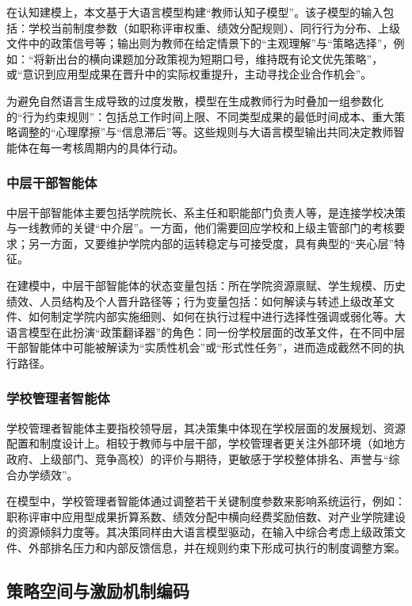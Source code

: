 \documentclass[UTF8, zihao=-4, fontset=mac]{ctexart}
\begin{document}
在认知建模上，本文基于大语言模型构建“教师认知子模型”。该子模型的输入包括：学校当前制度参数（如职称评审权重、绩效分配规则）、同行行为分布、上级文件中的政策信号等；输出则为教师在给定情景下的“主观理解”与“策略选择”，例如：“将新出台的横向课题加分政策视为短期口号，维持既有论文优先策略”，或“意识到应用型成果在晋升中的实际权重提升，主动寻找企业合作机会”。

为避免自然语言生成导致的过度发散，模型在生成教师行为时叠加一组参数化的“行为约束规则”：包括总工作时间上限、不同类型成果的最低时间成本、重大策略调整的“心理摩擦”与“信息滞后”等。这些规则与大语言模型输出共同决定教师智能体在每一考核周期内的具体行动。

\subsubsection{中层干部智能体}

中层干部智能体主要包括学院院长、系主任和职能部门负责人等，是连接学校决策与一线教师的关键“中介层”。一方面，他们需要回应学校和上级主管部门的考核要求；另一方面，又要维护学院内部的运转稳定与可接受度，具有典型的“夹心层”特征。

在建模中，中层干部智能体的状态变量包括：所在学院资源禀赋、学生规模、历史绩效、人员结构及个人晋升路径等；行为变量包括：如何解读与转述上级改革文件、如何制定学院内部实施细则、如何在执行过程中进行选择性强调或弱化等。大语言模型在此扮演“政策翻译器”的角色：同一份学校层面的改革文件，在不同中层干部智能体中可能被解读为“实质性机会”或“形式性任务”，进而造成截然不同的执行路径。

\subsubsection{学校管理者智能体}

学校管理者智能体主要指校领导层，其决策集中体现在学校层面的发展规划、资源配置和制度设计上。相较于教师与中层干部，学校管理者更关注外部环境（如地方政府、上级部门、竞争高校）的评价与期待，更敏感于学校整体排名、声誉与“综合办学绩效”。

在模型中，学校管理者智能体通过调整若干关键制度参数来影响系统运行，例如：职称评审中应用型成果折算系数、绩效分配中横向经费奖励倍数、对产业学院建设的资源倾斜力度等。其决策同样由大语言模型驱动，在输入中综合考虑上级政策文件、外部排名压力和内部反馈信息，并在规则约束下形成可执行的制度调整方案。

\subsection{策略空间与激励机制编码}
\end{document}
